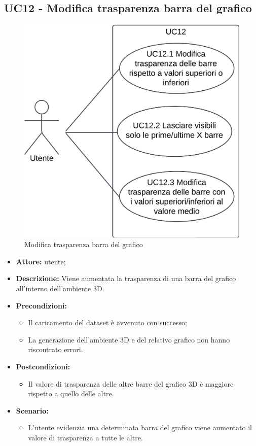 \subsection{UC12 - Modifica trasparenza barra del grafico}
\begin{figure}[h!]\centering
    \includegraphics[scale=0.7]{template/images/UC12.png}
    \caption{Modifica trasparenza barra del grafico}
\end{figure}
\begin{itemize}    
    \item \textbf{Attore:} utente;
    \item \textbf{Descrizione:} Viene aumentata la trasparenza di una barra del grafico all'interno dell'ambiente 3D.
    \item \textbf{Precondizioni:}    
        \begin{itemize}
            \item Il caricamento del dataset è avvenuto con successo;
            \item La generazione dell'ambiente 3D e del relativo grafico non hanno riscontrato errori.
        \end{itemize}    
    \item \textbf{Postcondizioni:}
        \begin{itemize}
            \item Il valore di trasparenza delle altre barre del grafico 3D è maggiore rispetto a quello delle altre.
        \end{itemize}    
    \item \textbf{Scenario:} 
        \begin{itemize}
            \item L'utente evidenzia una determinata barra del grafico viene aumentato il valore di trasparenza a tutte le altre.
        \end{itemize}
\end{itemize}
